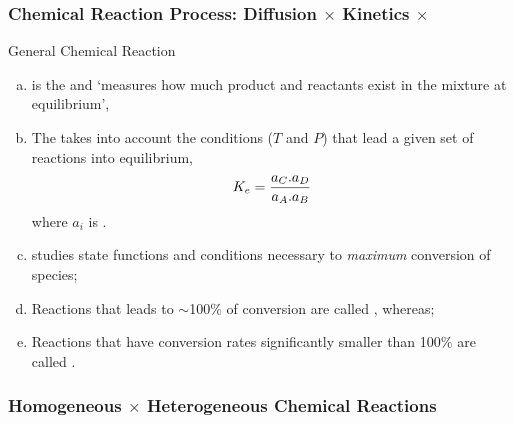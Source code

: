 \documentclass[10pt,compress,unknownkeysallowed]{beamer}
\begin{document}
\begin{frame}
  \frametitle{Chemical Reaction Process: Diffusion $\times$ Kinetics $\times$ }

  \begin{block}{\begin{center}General Chemical Reaction\end{center}}
  \end{block}  
   \begin{enumerate}[a)]
       \item<1->  is the  and `measures how much product and reactants exist in the mixture at equilibrium',
       \item<2-> The  takes into account the conditions ($T$ and $P$) that lead a given set of reactions into equilibrium, \eg
             \begin{displaymath}
                  K_{e} = \displaystyle\frac{a_{C}.a_{D}}{a_{A}.a_{B}}
             \end{displaymath}
             where $a_{i}$ is . 
       \item<3->  studies state functions and conditions necessary to {\it maximum} conversion of species;
       \item<3-> Reactions that leads to $\sim$100$\%$ of conversion are called , whereas;
       \item<3-> Reactions that have conversion rates significantly smaller than 100$\%$ are called .
   \end{enumerate}
\end{frame}
\normalsize

\begin{frame}
  \frametitle{Homogeneous $\times$ Heterogeneous Chemical Reactions}

\end{frame}
\normalsize
\end{document}
